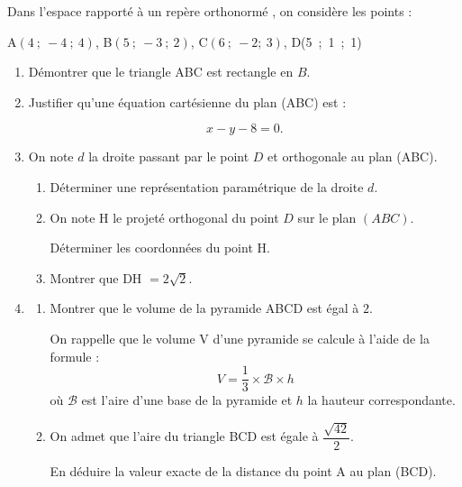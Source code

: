 Dans l'espace rapporté à un repère orthonormé \Oijk, on considère les points :

\begin{center}
A$(4~;~-4~;~4)$, \quad B$(5~;~-3~;~2)$, \quad C$(6~;~- 2;~3)$, \quad D(5~;~1~;~1)
\end{center}

\begin{enumerate}
\item Démontrer que le triangle ABC est rectangle en $B$.
\item Justifier qu’une équation cartésienne du plan (ABC) est :

\[
x - y - 8 = 0.
\]

\item On note $d$ la droite passant par le point $D$ et orthogonale au plan (ABC).

\medskip

	\begin{enumerate}
		\item Déterminer une représentation paramétrique de la droite $d$.
		\item On note H le projeté orthogonal du point $D$ sur le plan $(ABC)$.
		
Déterminer les coordonnées du point H.
		\item Montrer que DH $= 2\sqrt 2$.
	\end{enumerate}
\item 
	\begin{enumerate}
		\item Montrer que le volume de la pyramide ABCD est égal à $2$.

On rappelle que le volume V d'une pyramide se calcule à l'aide de la formule :
\[V = \dfrac13 \times \mathcal{B} \times h\]
où $\mathcal{B}$ est l'aire d'une base de la pyramide et $h$ la hauteur correspondante.
		\item On admet que l'aire du triangle BCD est égale à $\dfrac{\sqrt{42}}{2}$.

En déduire la valeur exacte de la distance du point A au plan (BCD).
	\end{enumerate}
\end{enumerate}
